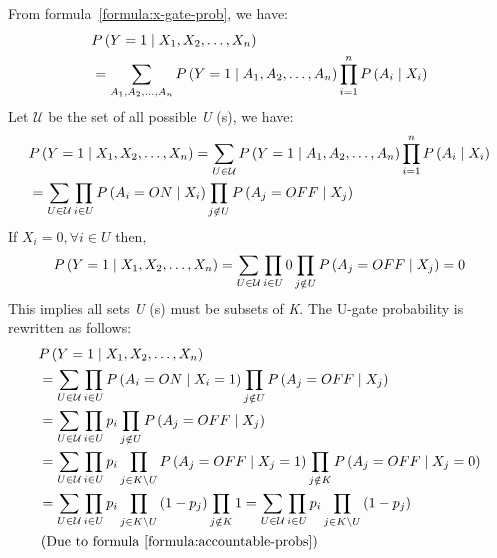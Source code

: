 \documentclass{article}
\numberwithin{equation}{section}
\numberwithin{figure}{section}
\numberwithin{table}{section}
\begin{document}
From formula~\ref{formula:x-gate-prob}, we have:
\begin{align*}
&P\left(Y=1\mathrel{\left|\vphantom{Y=1 X_1,X_2,\dots ,X_n}\right.\kern-\nulldelimiterspace}X_1,X_2,\dots ,X_n\right)\\
&=\sum_{A_1,A_2,\dots ,A_n}{P\left(Y=1\mathrel{\left|\vphantom{Y=1 A_1,A_2,\dots ,A_n}\right.\kern-\nulldelimiterspace}A_1,A_2,\dots ,A_n\right)\prod^n_{i=1}{P\left(A_i\mathrel{\left|\vphantom{A_i X_i}\right.\kern-\nulldelimiterspace}X_i\right)}}
\end{align*}
Let $\mathcal{U}$ be the set of all possible \textit{U} (s), we have:
\begin{align*}
&P\left(Y=1\mathrel{\left|\vphantom{Y=1 X_1,X_2,\dots ,X_n}\right.\kern-\nulldelimiterspace}X_1,X_2,\dots ,X_n\right)=\sum_{U\in \mathcal{U}}{P\left(Y=1\mathrel{\left|\vphantom{Y=1 A_1,A_2,\dots ,A_n}\right.\kern-\nulldelimiterspace}A_1,A_2,\dots ,A_n\right)\prod^n_{i=1}{P\left(A_i\mathrel{\left|\vphantom{A_i X_i}\right.\kern-\nulldelimiterspace}X_i\right)}}\\ 
&=\sum_{U\in \mathcal{U}}{\prod_{i\in U}{P\left(A_i=ON\mathrel{\left|\vphantom{A_i=ON X_i}\right.\kern-\nulldelimiterspace}X_i\right)}\prod_{j\notin U}{P\left(A_j=OFF\mathrel{\left|\vphantom{A_j=OFF X_j}\right.\kern-\nulldelimiterspace}X_j\right)}}
\end{align*}
If $X_i=0,\forall i\in U$ then,
\[P\left(Y=1\mathrel{\left|\vphantom{Y=1 X_1,X_2,\dots ,X_n}\right.\kern-\nulldelimiterspace}X_1,X_2,\dots ,X_n\right)=\sum_{U\in \mathcal{U}}{\prod_{i\in U}{0}\prod_{j\notin U}{P\left(A_j=OFF\mathrel{\left|\vphantom{A_j=OFF X_j}\right.\kern-\nulldelimiterspace}X_j\right)}}=0\] 
This implies all sets \textit{U} (s) must be subsets of \textit{K}. The U-gate probability is rewritten as follows:
\begin{align*}
&P\left(Y=1\mathrel{\left|\vphantom{Y=1 X_1,X_2,\dots ,X_n}\right.\kern-\nulldelimiterspace}X_1,X_2,\dots ,X_n\right)\\
&=\sum_{U\in \mathcal{U}}{\prod_{i\in U}{P\left(A_i=ON\mathrel{\left|\vphantom{A_i=ON X_i=1}\right.\kern-\nulldelimiterspace}X_i=1\right)}\prod_{j\notin U}{P\left(A_j=OFF\mathrel{\left|\vphantom{A_j=OFF X_j}\right.\kern-\nulldelimiterspace}X_j\right)}}\\
&=\sum_{U\in \mathcal{U}}{\prod_{i\in U}{p_i}\prod_{j\notin U}{P\left(A_j=OFF\mathrel{\left|\vphantom{A_j=OFF X_j}\right.\kern-\nulldelimiterspace}X_j\right)}}\\
&=\sum_{U\in \mathcal{U}}{\prod_{i\in U}{p_i}\prod_{j\in K\backslash U}{P\left(A_j=OFF\mathrel{\left|\vphantom{A_j=OFF X_j=1}\right.\kern-\nulldelimiterspace}X_j=1\right)}\prod_{j\notin K}{P\left(A_j=OFF\mathrel{\left|\vphantom{A_j=OFF X_j=0}\right.\kern-\nulldelimiterspace}X_j=0\right)}}\\
&=\sum_{U\in \mathcal{U}}{\prod_{i\in U}{p_i}\prod_{j\in K\backslash U}{\left(1-p_j\right)}\prod_{j\notin K}{1}}=\sum_{U\in \mathcal{U}}{\prod_{i\in U}{p_i}\prod_{j\in K\backslash U}{\left(1-p_j\right)}}\\
&\left(\mathrm{Due\ to\ formula~\ref{formula:accountable-probs}}\right)
\end{align*}
\end{document}

